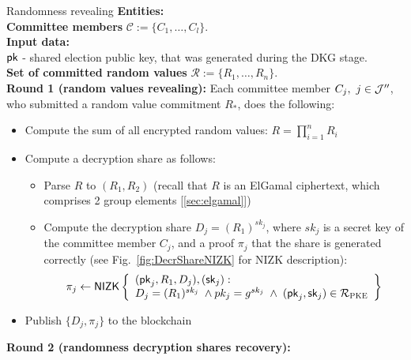 \begin{boxfig}{\label{fig:rand_reveal}Randomness revealing}{}
\footnotesize
\textbf{Entities:}\\
    \hspace*{6mm} \textbf{Committee members} $\mathcal{C}:=\{C_1,\ldots, C_l \}$.\\

\textbf{Input data:}\\
    \hspace*{6mm} $\mathsf{pk}$ - shared election public key, that was generated during the DKG stage.\\
    \hspace*{6mm} \textbf{Set of committed random values} $\mathcal{R}:=\{R_1,\ldots, R_n \}$.\\

\textbf{Round 1 (random values revealing):}
Each committee member $C_j,\ j\in\mathcal{J}''$, who submitted a random value commitment $R_*$, does the following:
\begin{itemize}
    \item Compute the sum of all encrypted random values: $R=\prod_{i=1}^{n} R_i$
    \item Compute a decryption share as follows:
    \begin{itemize}
        \item Parse $R$ to $(R_{1}, R_{2})$ (recall that $R$ is an ElGamal ciphertext, which comprises 2 group elements [\ref{sec:elgamal}])
        \item Compute the decryption share $D_{j}=(R_{1})^{sk_j}$, where $sk_j$ is a secret key of the committee member $C_j$, and a proof $\pi_{j}$ that the share is generated correctly (see Fig.~\ref{fig:DecrShareNIZK} for NIZK description):
        \begin{equation*}
        \pi_{j}\leftarrow\mathsf{NIZK}\left\{\begin{array}{l} (\mathsf{pk}_j, R_{1}, D_{j}),(\mathsf{sk}_j): \\
         D_{j}=(R_{1})^{sk_j} \; \wedge pk_j=g^{sk_j} \; \wedge \;  (\mathsf{pk}_j,\mathsf{sk}_j)\in\mathcal{R}_{\textsc{PKE}} \end{array}\right\}
        \end{equation*}
    \end{itemize}
    \item Publish $\{D_{j}, \pi_{j}\}$ to the blockchain\\
\end{itemize}

\textbf{Round 2 (randomness decryption shares recovery):}


\end{boxfig}
